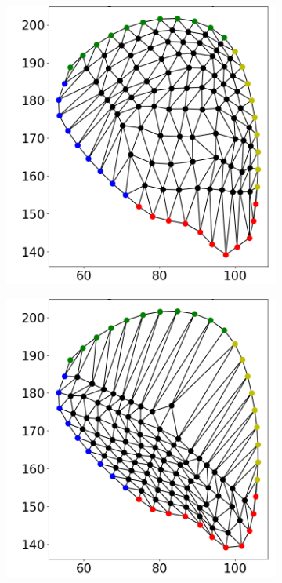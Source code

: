 \begin{figure}
\begin{subfigure}[t]{0.24\textwidth}
    \label{fig:tri_02}%
  \end{subfigure}
  \begin{subfigure}[t]{0.24\textwidth}%
    \centering%
    \includegraphics[width=\textwidth, trim=30mm 14mm 6mm 6mm, clip]{images/fiber_creation/mesh_plots/out_1_2_0_w.png}%
    \label{fig:tri_12}%
  \end{subfigure}
  \begin{subfigure}[t]{0.24\textwidth}%
    \centering%
    \includegraphics[width=\textwidth, trim=30mm 14mm 6mm 6mm, clip]{images/fiber_creation/mesh_plots/out_2_2_0_w.png}%
    \label{fig:tri_22}%
  \end{subfigure}\\[-4mm]
  

\end{figure}
